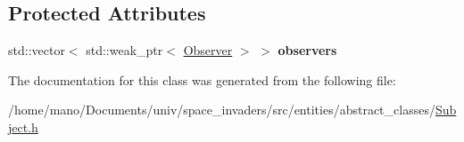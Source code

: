 \subsection*{Protected Attributes}
\begin{DoxyCompactItemize}
\item 
\mbox{\label{classentities_1_1Subject_a3764a6f9d547038483f139cc72061c44}} 
std\+::vector$<$ std\+::weak\+\_\+ptr$<$ \hyperlink{classentities_1_1Observer}{Observer} $>$ $>$ {\bfseries observers}
\end{DoxyCompactItemize}


The documentation for this class was generated from the following file\+:\begin{DoxyCompactItemize}
\item 
/home/mano/\+Documents/univ/space\+\_\+invaders/src/entities/abstract\+\_\+classes/\hyperlink{Subject_8h}{Subject.\+h}\end{DoxyCompactItemize}

